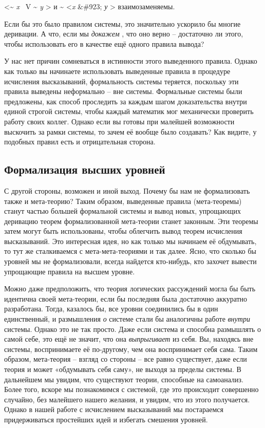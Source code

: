 \documentclass[../main.tex]{subfiles}
\begin{document}
\textless{}\textbf{\textasciitilde{}} \emph{x~} V \textbf{\textasciitilde{}} \emph{y} \textgreater{} и \textbf{\textasciitilde{}} \textless{}\emph{x} \&\#923; \emph{у} \textgreater{} взаимозаменяемы.

Если бы это было правилом системы, это значительно ускорило бы многие деривации. А что, если мы \emph{докажем} , что оно верно \--- достаточно ли этого, чтобы использовать его в качестве ещё одного правила вывода?

У нас нет причин сомневаться в истинности этого выведенного правила. Однако как только вы начинаете использовать выведенные правила в процедуре исчисления высказываний, формальность системы теряется, поскольку эти правила выведены неформально \--- вне системы. Формальные системы были предложены, как способ проследить за каждым шагом доказательства внутри единой строгой системы, чтобы каждый математик мог механически проверить работу своих коллег. Однако если вы готовы при малейшей возможности выскочить за рамки системы, то зачем её вообще было создавать? Как видите, у подобных правил есть и отрицательная сторона.


\subsection{Формализация высших уровней}

С другой стороны, возможен и иной выход. Почему бы нам не формализовать также и мета-теорию? Таким образом, выведенные правила (мета-теоремы) станут частью большей формальной системы и вывод новых, упрощающих деривацию теорем формализованной мета-теории станет законным. Эти теоремы затем могут быть использованы, чтобы облегчить вывод теорем исчисления высказываний. Это интересная идея, но как только мы начинаем её обдумывать, то тут же сталкиваемся с мета-мета-теориями и так далее. Ясно, что сколько бы уровней мы не формализовали, всегда найдется кто-нибудь, кто захочет вывести упрощающие правила на высшем уровне.

Можно даже предположить, что теория логических рассуждений могла бы быть идентична своей мета-теории, если бы последняя была достаточно аккуратно разработана. Тогда, казалось бы, все уровни соединились бы в один единственный, и размышления \emph{о} системе стали бы аналогичны работе \emph{внутри} системы. Однако это не так просто. Даже если система и способна размышлять о самой себе, это ещё не значит, что она \emph{выпрыгивает} из себя. Вы, находясь вне системы, воспринимаете её по-другому, чем она воспринимает себя сама. Таким образом, мета-теория \--- взгляд со стороны \--- все равно существует, даже если теория и может «обдумывать себя саму», не выходя за пределы системы. В дальнейшем мы увидим, что существуют теории, способные на самоанализ. Более того, вскоре мы познакомимся с системой, где это происходит совершенно случайно, без малейшего нашего желания, и увидим, что из этого получается. Однако в нашей работе с исчислением высказываний мы постараемся придерживаться простейших идей и избегать смешения уровней.
\end{document}

